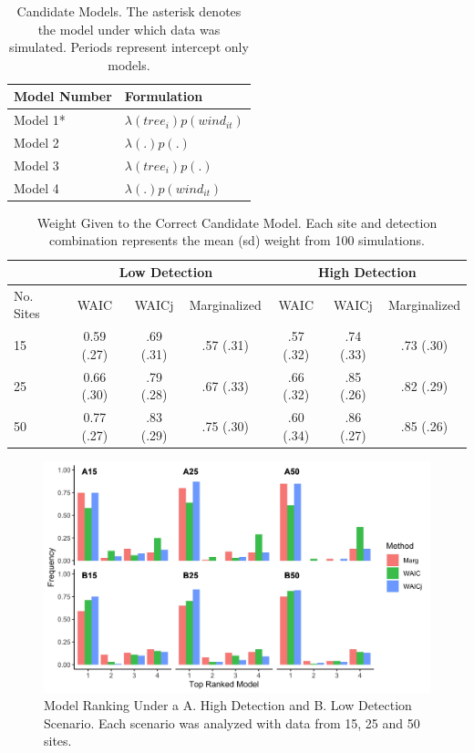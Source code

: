 \documentclass[12pt]{article}
\begin{document}
\begin{table}
\begin{center}
\begin{tabular}{ll} 

Model Number &  Formulation \\ 
  \hline
 Model 1* & $\lambda(tree_i)p(wind_{it})$ \\ 
 Model 2 & $\lambda(.)p(.)$ \\ 
 Model 3 & $\lambda(tree_i)p(.)$ \\ 
 Model 4 & $\lambda(.)p(wind_{it})$ \\ 
 \hline
\end{tabular}
\caption{Candidate Models. The asterisk denotes the model under which data was simulated. Periods represent intercept only models.}
\label{table:CandidateMods}
\end{center}
\end{table}

\newpage

\begin{table}
\begin{center}
\begin{tabular}{lcccccc} 
 \hline
 &  \multicolumn{3}{c}{Low Detection} &  \multicolumn{3}{c}{High Detection} \\
  \hline
  No. Sites & WAIC & WAICj & Marginalized & WAIC & WAICj & Marginalized\\ 
 \hline
 15 & 0.59 (.27) & .69 (.31) & .57 (.31) & .57 (.32) & .74 (.33) & .73 (.30)\\
 25 & 0.66 (.30) & .79 (.28) & .67 (.33) & .66 (.32) & .85 (.26) & .82 (.29)\\
 50 & 0.77 (.27) & .83 (.29) & .75 (.30) & .60 (.34) & .86 (.27) & .85 (.26)\\ 
\end{tabular}
\caption{Weight Given to the Correct Candidate Model. Each site and detection combination represents the mean (sd) weight from 100 simulations.}
\label{table:modweights}
\end{center}
\end{table}

\newpage

\begin{center}
\begin{figure}
  \includegraphics[scale=.15]{Ranking_WAIC.jpeg}
  \caption{Model Ranking Under a A. High Detection and B. Low Detection Scenario. Each scenario was analyzed with data from 15, 25 and 50 sites.}
  \label{fig:modranks}
\end{figure}
\end{center}



 
 
 
\end{document}
